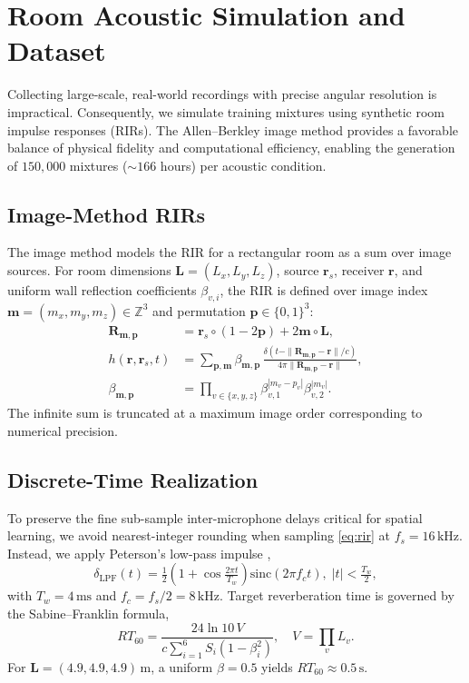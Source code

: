 \documentclass[journal,10pt]{IEEEtran}
\newcommand{\Z}{\mathbb{Z}}
\newcommand{\br}{\mathbf{r}}
\newcommand{\bp}{\mathbf{p}}
\newcommand{\bmI}{\mathbf{m}}
\begin{document}
\section{Room Acoustic Simulation and Dataset}
\label{sec:data}
Collecting large-scale, real-world recordings with precise angular resolution is impractical. Consequently, we simulate training mixtures using synthetic room impulse responses (RIRs). The Allen--Berkley image method \cite{allen1979image,habets2010rir} provides a favorable balance of physical fidelity and computational efficiency, enabling the generation of \(150{,}000\) mixtures (\(\sim\!166\) hours) per acoustic condition.

\subsection{Image-Method RIRs}
The image method models the RIR for a rectangular room as a sum over image sources. For room dimensions \(\mathbf{L}=(L_x,L_y,L_z)\), source \(\br_s\), receiver \(\br\), and uniform wall reflection coefficients \(\beta_{v,i}\), the RIR is defined over image index \(\bmI=(m_x,m_y,m_z)\in\Z^3\) and permutation \(\bp\in\{0,1\}^3\):
\begin{align}
\mathbf{R}_{\bmI,\bp}&=\br_s\circ(1-2\bp)+2\bmI\circ\mathbf{L},\\
h(\br,\br_s,t)&=\!\!\sum_{\bp,\bmI}\!\beta_{\bmI,\bp}\,\frac{\delta\!\left(t-\|\mathbf{R}_{\bmI,\bp}-\br\|/c\right)}{4\pi\|\mathbf{R}_{\bmI,\bp}-\br\|},\label{eq:rir}\\
\beta_{\bmI,\bp}&=\!\!\prod_{v\in\{x,y,z\}}\!\!\beta_{v,1}^{|m_v-p_v|}\beta_{v,2}^{|m_v|}.
\end{align}
The infinite sum is truncated at a maximum image order corresponding to numerical precision.

\subsection{Discrete-Time Realization}
To preserve the fine sub-sample inter-microphone delays critical for spatial learning, we avoid nearest-integer rounding when sampling \eqref{eq:rir} at \(f_s=16\,\mathrm{kHz}\). Instead, we apply Peterson's low-pass impulse \cite{peterson1986},
\begin{equation}
\delta_{\mathrm{LPF}}(t)=\tfrac{1}{2}\!\left(1+\cos\!\tfrac{2\pi t}{T_w}\right)\!\mathrm{sinc}(2\pi f_c t),\;|t|<\tfrac{T_w}{2},
\end{equation}
with \(T_w=4\,\mathrm{ms}\) and \(f_c=f_s/2=8\,\mathrm{kHz}\). Target reverberation time is governed by the Sabine--Franklin formula,
\begin{equation}
RT_{60}=\frac{24\ln 10\,V}{c\sum_{i=1}^{6}S_i(1-\beta_i^2)},\quad V=\prod_v L_v.
\label{eq:rt60}
\end{equation}
For \(\mathbf{L}=(4.9,4.9,4.9)\,\mathrm{m}\), a uniform \(\beta=0.5\) yields \(RT_{60}\!\approx\!0.5\,\mathrm{s}\).
\end{document}
